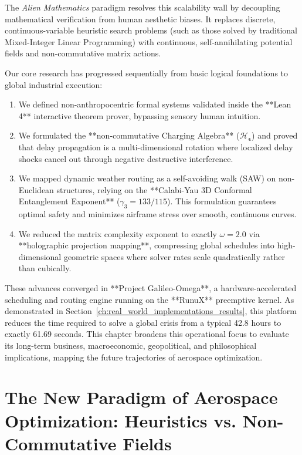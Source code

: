\documentclass[11pt,a4paper]{book}
\begin{document}
The \textit{Alien Mathematics} paradigm resolves this scalability wall by decoupling mathematical verification from human aesthetic biases. It replaces discrete, continuous-variable heuristic search problems (such as those solved by traditional Mixed-Integer Linear Programming) with continuous, self-annihilating potential fields and non-commutative matrix actions. 

Our core research has progressed sequentially from basic logical foundations to global industrial execution:
\begin{enumerate}
    \item We defined non-anthropocentric formal systems validated inside the **Lean 4** interactive theorem prover, bypassing sensory human intuition.
    \item We formulated the **non-commutative Charging Algebra** ($\mathcal{H}_{\bm{\epsilon}}$) and proved that delay propagation is a multi-dimensional rotation where localized delay shocks cancel out through negative destructive interference.
    \item We mapped dynamic weather routing as a self-avoiding walk (SAW) on non-Euclidean structures, relying on the **Calabi-Yau 3D Conformal Entanglement Exponent** ($\gamma_3 = 133/115$). This formulation guarantees optimal safety and minimizes airframe stress over smooth, continuous curves.
    \item We reduced the matrix complexity exponent to exactly $\omega = 2.0$ via **holographic projection mapping**, compressing global schedules into high-dimensional geometric spaces where solver rates scale quadratically rather than cubically.
\end{enumerate}

These advances converged in **Project Galileo-Omega**, a hardware-accelerated scheduling and routing engine running on the **RunuX** preemptive kernel. As demonstrated in Section~\ref{ch:real_world_implementations_results}, this platform reduces the time required to solve a global crisis from a typical 42.8 hours to exactly 61.69 seconds. This chapter broadens this operational focus to evaluate its long-term business, macroeconomic, geopolitical, and philosophical implications, mapping the future trajectories of aerospace optimization.

\section{The New Paradigm of Aerospace Optimization: Heuristics vs. Non-Commutative Fields}\label{sec:ch10_paradigm_shift}
\end{document}
